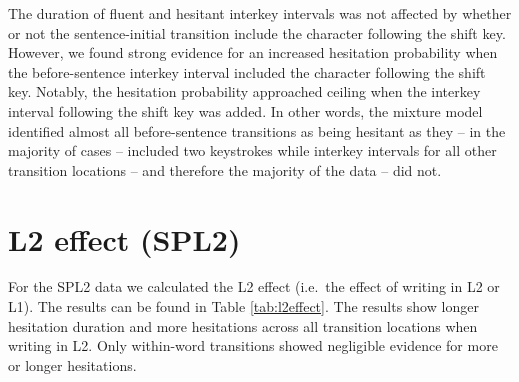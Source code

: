\documentclass[
  man,floatsintext]{apa7}
\begin{document}
The duration of fluent and hesitant interkey intervals was not affected by whether or not the sentence-initial transition include the character following the shift key. However, we found strong evidence for an increased hesitation probability when the before-sentence interkey interval included the character following the shift key. Notably, the hesitation probability approached ceiling when the interkey interval following the shift key was added. In other words, the mixture model identified almost all before-sentence transitions as being hesitant as they -- in the majority of cases -- included two keystrokes while interkey intervals for all other transition locations -- and therefore the majority of the data -- did not.

\newpage

\hypertarget{l2-effect-spl2}{%
\section{L2 effect (SPL2)}\label{l2-effect-spl2}}

For the SPL2 data we calculated the L2 effect (i.e.~the effect of writing in L2 or L1). The results can be found in Table \ref{tab:l2effect}. The results show longer hesitation duration and more hesitations across all transition locations when writing in L2. Only within-word transitions showed negligible evidence for more or longer hesitations.
\end{document}
